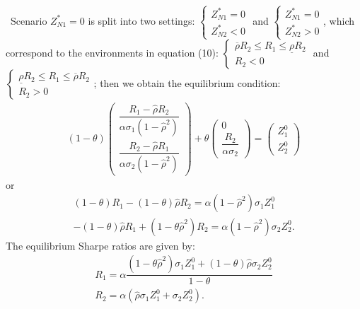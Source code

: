 \documentclass[10pt]{article}
\begin{document}
\quad \ 
Scenario $ Z_{N 1}^* = 0 $ is split into two settings: $ \left\{ \begin{matrix} Z_{N 1}^* = 0 \\ Z_{N 2}^* < 0 \end{matrix} \right. $ and $ \left\{ \begin{matrix} Z_{N 1}^* = 0 \\ Z_{N 2}^* > 0 \end{matrix} \right. $, which correspond to the environments in equation (10): $ \left\{ \begin{matrix} \overline{\rho} R_2 \leqslant R_1 \leqslant \underline{\rho} R_2 \\ R_2 < 0 \end{matrix} \right. $ and $ \left\{ \begin{matrix} \underline{\rho} R_2 \leqslant R_1 \leqslant \overline{\rho} R_2 \\ R_2 > 0 \end{matrix} \right. $; then we obtain the equilibrium condition:
\begin{eqnarray}
(1 - \theta) \left( \begin{matrix} \dfrac{R_1 - {\hat \rho} R_2}{\alpha \sigma_1 (1 - \hat \rho^2)} \\ \dfrac{R_2 - {\hat \rho} R_1}{\alpha \sigma_2 (1 - {\hat \rho}^2)} \end{matrix} \right) + \theta \left( \begin{matrix} 0 \\ \dfrac{R_2}{\alpha \sigma_2} \end{matrix} \right) = \left( \begin{matrix} Z_1^0 \\ Z_2^0 \end{matrix} \right)
\end{eqnarray}
or
\begin{eqnarray*}
& (1 - \theta) R_1 - (1 - \theta) {\hat \rho} R_2 = \alpha (1 - {\hat \rho}^2) \sigma_1 Z_1^0 & \\
& - (1 - \theta) {\hat \rho} R_1 + (1 - \theta {\hat \rho}^2) R_2 = \alpha (1 - {\hat \rho}^2) \sigma_2 Z_2^0. &
\end{eqnarray*}
The equilibrium Sharpe ratios are given by:
\begin{eqnarray}
& R_1 = \alpha \dfrac{(1 - \theta {\hat \rho}^2) \sigma_1 Z_1^0 + (1 - \theta) {\hat \rho} \sigma_2 Z_2^0}{1 - \theta} & \\
& R_2 = \alpha ({\hat \rho} \sigma_1 Z_1^0 + \sigma_2 Z_2^0). &
\end{eqnarray}
\end{document}
